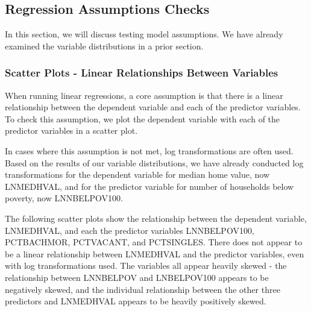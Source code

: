 \documentclass[
]{article}
\newenvironment{Shaded}{\begin{snugshade}}{\end{snugshade}}
\newcommand{\AttributeTok}[1]{\textcolor[rgb]{0.13,0.29,0.53}{#1}}
\newcommand{\DecValTok}[1]{\textcolor[rgb]{0.00,0.00,0.81}{#1}}
\newcommand{\FunctionTok}[1]{\textcolor[rgb]{0.13,0.29,0.53}{\textbf{#1}}}
\newcommand{\NormalTok}[1]{#1}
\newcommand{\SpecialCharTok}[1]{\textcolor[rgb]{0.81,0.36,0.00}{\textbf{#1}}}
\begin{document}
\hypertarget{regression-assumptions-checks}{%
\subsection{Regression Assumptions
Checks}\label{regression-assumptions-checks}}

In this section, we will discuss testing model assumptions. We have
already examined the variable distributions in a prior section.

\hypertarget{scatter-plots---linear-relationships-between-variables}{%
\subsubsection{Scatter Plots - Linear Relationships Between
Variables}\label{scatter-plots---linear-relationships-between-variables}}

When running linear regressions, a core assumption is that there is a
linear relationship between the dependent variable and each of the
predictor variables. To check this assumption, we plot the dependent
variable with each of the predictor variables in a scatter plot.

In cases where this assumption is not met, log transformations are often
used. Based on the results of our variable distributions, we have
already conducted log transformations for the dependent variable for
median home value, now LNMEDHVAL, and for the predictor variable for
number of households below poverty, now LNNBELPOV100.

The following scatter plots show the relationship between the dependent
variable, LNMEDHVAL, and each the predictor variables LNNBELPOV100,
PCTBACHMOR, PCTVACANT, and PCTSINGLES. There does not appear to be a
linear relationship between LNMEDHVAL and the predictor variables, even
with log transformations used. The variables all appear heavily skewed -
the relationship between LNNBELPOV and LNBELPOV100 appears to be
negatively skewed, and the individual relationship between the other
three predictors and LNMEDHVAL appears to be heavily positively skewed.

\begin{Shaded}
\end{Shaded}
\end{document}
